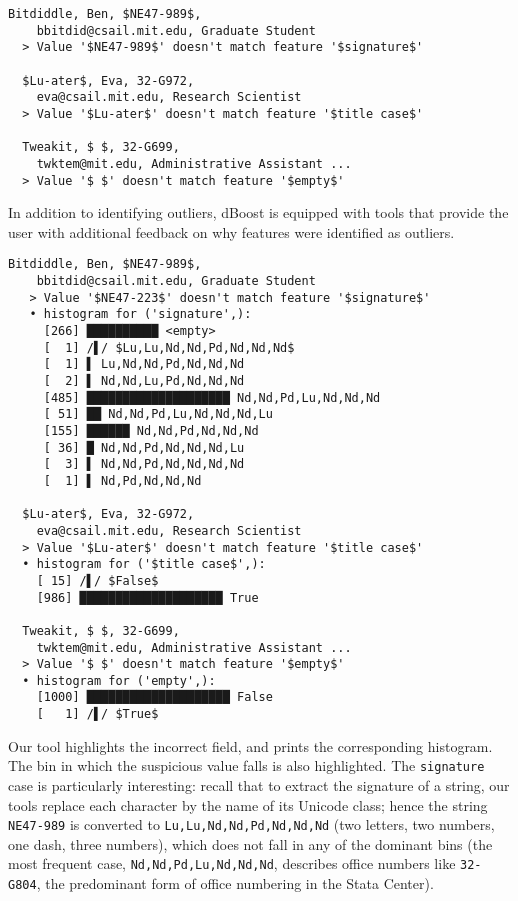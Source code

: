 \begin{lstlisting}[gobble=2]
  Bitdiddle, Ben, $NE47-989$,
    bbitdid@csail.mit.edu, Graduate Student
  > Value '$NE47-989$' doesn't match feature '$signature$'

  $Lu-ater$, Eva, 32-G972,
    eva@csail.mit.edu, Research Scientist
  > Value '$Lu-ater$' doesn't match feature '$title case$'

  Tweakit, $ $, 32-G699,
    twktem@mit.edu, Administrative Assistant ...
  > Value '$ $' doesn't match feature '$empty$'
\end{lstlisting}

In addition to identifying outliers, dBoost is equipped with tools that provide the user with additional feedback on why features were identified as outliers.

\begin{lstlisting}[gobble=2]
  Bitdiddle, Ben, $NE47-989$,
    bbitdid@csail.mit.edu, Graduate Student
   > Value '$NE47-223$' doesn't match feature '$signature$'
   • histogram for ('signature',):
     [266] ██████████ <empty>
     [  1] /▌/ $Lu,Lu,Nd,Nd,Pd,Nd,Nd,Nd$
     [  1] ▌ Lu,Nd,Nd,Pd,Nd,Nd,Nd
     [  2] ▌ Nd,Nd,Lu,Pd,Nd,Nd,Nd
     [485] ████████████████████ Nd,Nd,Pd,Lu,Nd,Nd,Nd
     [ 51] ██ Nd,Nd,Pd,Lu,Nd,Nd,Nd,Lu
     [155] ██████ Nd,Nd,Pd,Nd,Nd,Nd
     [ 36] █ Nd,Nd,Pd,Nd,Nd,Nd,Lu
     [  3] ▌ Nd,Nd,Pd,Nd,Nd,Nd,Nd
     [  1] ▌ Nd,Pd,Nd,Nd,Nd

  $Lu-ater$, Eva, 32-G972,
    eva@csail.mit.edu, Research Scientist
  > Value '$Lu-ater$' doesn't match feature '$title case$'
  • histogram for ('$title case$',):
    [ 15] /▌/ $False$
    [986] ████████████████████ True

  Tweakit, $ $, 32-G699,
    twktem@mit.edu, Administrative Assistant ...
  > Value '$ $' doesn't match feature '$empty$'
  • histogram for ('empty',):
    [1000] ████████████████████ False
    [   1] /▌/ $True$
\end{lstlisting}

Our tool highlights the incorrect field, and prints the corresponding histogram. The bin in which the suspicious value falls is also highlighted. The \texttt{signature} case is particularly interesting: recall that to extract the signature of a string, our tools replace each character by the name of its Unicode class; hence the string \texttt{NE47-989} is converted to \lstinline{Lu,Lu,Nd,Nd,Pd,Nd,Nd,Nd} (two letters, two numbers, one dash, three numbers), which does not fall in any of the dominant bins (the most frequent case, \lstinline{Nd,Nd,Pd,Lu,Nd,Nd,Nd}, describes office numbers like \lstinline{32-G804}, the predominant form of office numbering in the Stata Center).

